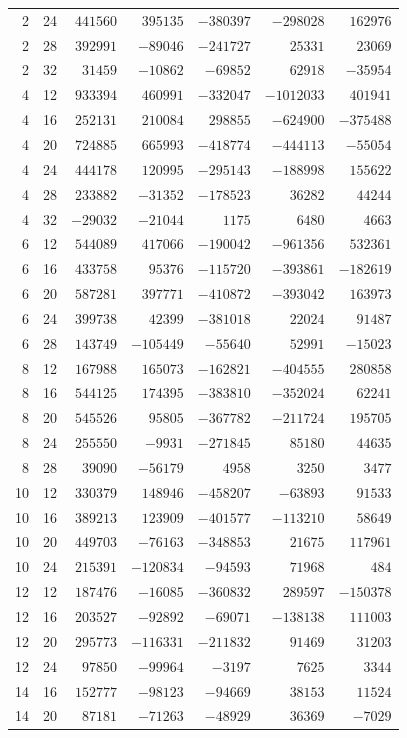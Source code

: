 \documentclass[11pt,colorlinks]{charlie}
\begin{document}
{\begin{longtable}{@{}rr rrrrr@{}}
2 & 24 & $441560$ & $395135$ & $-380397$ & $-298028$ & $162976$\\
2 & 28 & $392991$ & $-89046$ & $-241727$ & $25331$ & $23069$\\
2 & 32 & $31459$ & $-10862$ & $-69852$ & $62918$ & $-35954$\\
4 & 12 & $933394$ & $460991$ & $-332047$ & $-1012033$ & $401941$\\
4 & 16 & $252131$ & $210084$ & $298855$ & $-624900$ & $-375488$\\
4 & 20 & $724885$ & $665993$ & $-418774$ & $-444113$ & $-55054$\\
4 & 24 & $444178$ & $120995$ & $-295143$ & $-188998$ & $155622$\\
4 & 28 & $233882$ & $-31352$ & $-178523$ & $36282$ & $44244$\\
4 & 32 & $-29032$ & $-21044$ & $1175$ & $6480$ & $4663$\\
6 & 12 & $544089$ & $417066$ & $-190042$ & $-961356$ & $532361$\\
6 & 16 & $433758$ & $95376$ & $-115720$ & $-393861$ & $-182619$\\
6 & 20 & $587281$ & $397771$ & $-410872$ & $-393042$ & $163973$\\
6 & 24 & $399738$ & $42399$ & $-381018$ & $22024$ & $91487$\\
6 & 28 & $143749$ & $-105449$ & $-55640$ & $52991$ & $-15023$\\
8 & 12 & $167988$ & $165073$ & $-162821$ & $-404555$ & $280858$\\
8 & 16 & $544125$ & $174395$ & $-383810$ & $-352024$ & $62241$\\
8 & 20 & $545526$ & $95805$ & $-367782$ & $-211724$ & $195705$\\
8 & 24 & $255550$ & $-9931$ & $-271845$ & $85180$ & $44635$\\
8 & 28 & $39090$ & $-56179$ & $4958$ & $3250$ & $3477$\\
10 & 12 & $330379$ & $148946$ & $-458207$ & $-63893$ & $91533$\\
10 & 16 & $389213$ & $123909$ & $-401577$ & $-113210$ & $58649$\\
10 & 20 & $449703$ & $-76163$ & $-348853$ & $21675$ & $117961$\\
10 & 24 & $215391$ & $-120834$ & $-94593$ & $71968$ & $484$\\
12 & 12 & $187476$ & $-16085$ & $-360832$ & $289597$ & $-150378$\\
12 & 16 & $203527$ & $-92892$ & $-69071$ & $-138138$ & $111003$\\
12 & 20 & $295773$ & $-116331$ & $-211832$ & $91469$ & $31203$\\
12 & 24 & $97850$ & $-99964$ & $-3197$ & $7625$ & $3344$\\
14 & 16 & $152777$ & $-98123$ & $-94669$ & $38153$ & $11524$\\
14 & 20 & $87181$ & $-71263$ & $-48929$ & $36369$ & $-7029$\\
\bottomrule\end{longtable}
}
\end{document}
